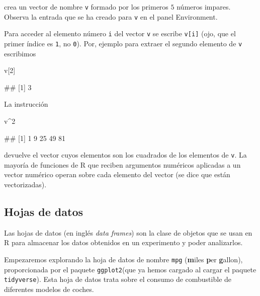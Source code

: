 \documentclass[
  title=normal,
  notoc,
  bib=normal]{mnye}
\newenvironment{Shaded}{\begin{snugshade}}{\end{snugshade}}
\newcommand{\DecValTok}[1]{\textcolor[rgb]{0.00,0.00,0.81}{#1}}
\newcommand{\NormalTok}[1]{#1}
\newcommand{\SpecialCharTok}[1]{\textcolor[rgb]{0.00,0.00,0.00}{#1}}
\begin{document}
crea un vector de nombre \texttt{v} formado por los primeros \(5\) números impares. Observa la entrada que se ha creado para \texttt{v} en el panel Environment.

Para acceder al elemento número \texttt{i} del vector \texttt{v} se escribe \texttt{v{[}i{]}} (ojo, que el primer índice es \texttt{1}, no \texttt{0}). Por, ejemplo para extraer el segundo elemento de \texttt{v} escribimos

\begin{Shaded}
\begin{Highlighting}[]
\NormalTok{v[}\DecValTok{2}\NormalTok{]}
\end{Highlighting}
\end{Shaded}

\begin{Shaded}
\begin{Highlighting}[]
\NormalTok{\#\# [1] 3}
\end{Highlighting}
\end{Shaded}

La instrucción

\begin{Shaded}
\begin{Highlighting}[]
\NormalTok{v}\SpecialCharTok{\^{}}\DecValTok{2}
\end{Highlighting}
\end{Shaded}

\begin{Shaded}
\begin{Highlighting}[]
\NormalTok{\#\# [1]  1  9 25 49 81}
\end{Highlighting}
\end{Shaded}

devuelve el vector cuyos elementos son los cuadrados de los elementos de \texttt{v}.
La mayoría de funciones de \textsf{R} que reciben argumentos numéricos aplicadas a un vector numérico operan sobre cada elemento del vector (se dice que están vectorizadas).

\hypertarget{hojas-de-datos}{%
\subsection{Hojas de datos}\label{hojas-de-datos}}

Las hojas de datos (en inglés \emph{data frames}) son la clase de objetos que se usan en \textsf{R} para almacenar los datos obtenidos en un experimento y poder analizarlos.

Empezaremos explorando la hoja de datos de nombre \texttt{mpg} (\textbf{m}iles \textbf{p}er \textbf{g}allon), proporcionada por el paquete \texttt{ggplot2}(que ya hemos cargado al cargar el paquete \texttt{tidyverse}). Esta hoja de datos trata sobre el consumo de combustible de diferentes modelos de coches.
\end{document}
